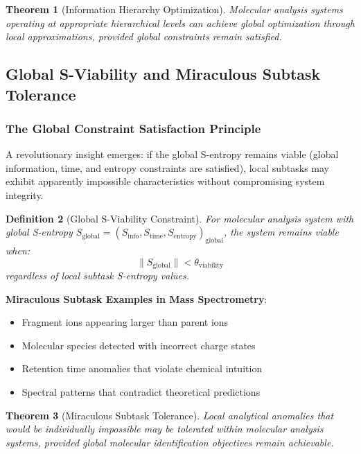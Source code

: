 \documentclass[11pt,a4paper]{article}
\newtheorem{theorem}{Theorem}[section]
\newtheorem{definition}[theorem]{Definition}
\theoremstyle{remark}
\begin{document}
\begin{theorem}[Information Hierarchy Optimization]
Molecular analysis systems operating at appropriate hierarchical levels can achieve global optimization through local approximations, provided global constraints remain satisfied.
\end{theorem}

\subsection{Global S-Viability and Miraculous Subtask Tolerance}

\subsubsection{The Global Constraint Satisfaction Principle}

A revolutionary insight emerges: if the global S-entropy remains viable (global information, time, and entropy constraints are satisfied), local subtasks may exhibit apparently impossible characteristics without compromising system integrity.

\begin{definition}[Global S-Viability Constraint]
For molecular analysis system with global S-entropy $S_{\text{global}} = (S_{\text{info}}, S_{\text{time}}, S_{\text{entropy}})_{\text{global}}$, the system remains viable when:
$$\|S_{\text{global}}\| < \theta_{\text{viability}}$$
regardless of local subtask S-entropy values.
\end{definition}

\textbf{Miraculous Subtask Examples in Mass Spectrometry}:
\begin{itemize}
\item Fragment ions appearing larger than parent ions
\item Molecular species detected with incorrect charge states
\item Retention time anomalies that violate chemical intuition
\item Spectral patterns that contradict theoretical predictions
\end{itemize}

\begin{theorem}[Miraculous Subtask Tolerance]
Local analytical anomalies that would be individually impossible may be tolerated within molecular analysis systems, provided global molecular identification objectives remain achievable.
\end{theorem}
\end{document}
